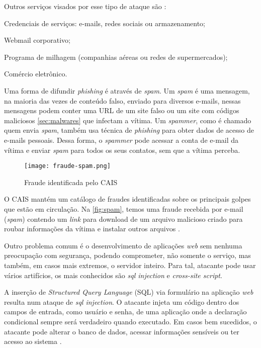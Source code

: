 Outros serviços visados por esse tipo de ataque são \cite{esr:tratamento}:
\begin{alineas}
\item Credenciais de serviços: e-mails, redes sociais ou armazenamento;
\item Webmail corporativo; 
\item Programa de milhagem (companhias aéreas ou redes de supermercados);
\item Comércio eletrônico.
\end{alineas}

Uma forma de difundir \textit{phishing} é através de \textit{spam}. Um \textit{spam} é uma mensagem, na maioria das vezes de conteúdo falso, enviado para diversos e-mails, nessas mensagens podem conter uma URL de um site falso ou um site com códigos maliciosos \autoref{sec:malwares} que infectam a vítima. Um \textit{spammer}, como é chamado quem envia \textit{spam}, também usa técnica de \textit{phishing} para obter dados de acesso de e-mails pessoais. Dessa forma, o \textit{spammer} pode acessar a conta de e-mail da vítima e enviar \textit{spam} para todos os seus contatos, sem que a vítima perceba.

\begin{figure}[htb]
 \centering
 \caption{Fraude identificada pelo CAIS}
 \texttt{[image: fraude-spam.png]}
 \label{fig:spam}
\end{figure}

O CAIS mantém um catálogo de fraudes identificadas sobre os principais golpes que estão em circulação. Na \autoref{fig:spam}, temos uma fraude recebida por e-mail (\textit{spam}) contendo um \textit{link} para download de um arquivo malicioso criado para roubar informações da vítima e instalar outros arquivos \cite{cais}.

Outro problema comum é o desenvolvimento de aplicações \textit{web} sem nenhuma preocupação com segurança, podendo comprometer, não somente o serviço, mas também, em casos mais extremos, o servidor inteiro. Para tal, atacante pode usar vários artifícios, os mais conhecidos são \textit{sql injection} e \textit{cross-site script}.

A inserção de \textit{Structured Query Language} (SQL) via formulário na aplicação \textit{web} resulta num ataque de \textit{sql injection}. O atacante injeta um código dentro dos campos de entrada, como usuário e senha, de uma aplicação onde a declaração condicional sempre será verdadeiro quando executado. Em casos bem sucedidos, o atacante pode alterar o banco de dados, acessar informações sensíveis ou ter acesso ao sistema \cite{sqlinjection:sankaran}.

